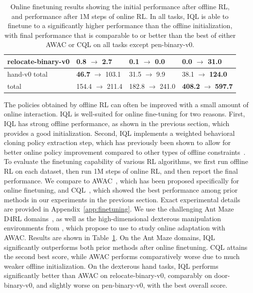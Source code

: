 \documentclass{article} %
\def\ourname{IQL\xspace}
\begin{document}
\begin{table}
\begin{tabular}{ l ||p{1.5cm} |p{1.5cm} | p{1.5cm}  }
    relocate-binary-v0 & \textbf{0.8} \; \; $\rightarrow$ 2.7 & 0.1 \; \; $\rightarrow$ 0.0 & 0.0 \; \; $\rightarrow$ \textbf{31.0} \\ \hline
    hand-v0 total & \textbf{46.7} \; $\rightarrow$ 103.1 & 31.5 \; $\rightarrow$ 9.9 & 38.1 \; $\rightarrow$ \textbf{124.0} \\ \hline \hline
    total & 154.4 $\rightarrow$ 211.4 & 182.8 $\rightarrow$ 241.0 & \textbf{408.2} $\rightarrow$ \textbf{597.7}
\end{tabular}
\caption{Online finetuning results showing the initial performance after offline RL, and performance after 1M steps of online RL. In all tasks, \ourname is able to finetune to a significantly higher performance than the offline initialization, with final performance that is comparable to or better than the best of either AWAC or CQL on all tasks except pen-binary-v0.}
\label{tab:finetuning}
\end{table}

The policies obtained by offline RL can often be improved with a small amount of online interaction.
\ourname is well-suited for online fine-tuning for two reasons.
First, \ourname has strong offline performance, as shown in the previous section, which provides a good initialization.
Second, \ourname implements a weighted behavioral cloning policy extraction step,
which has previously been shown to allow for better online policy improvement compared to other types of offline constraints~\citep{nair2020awac}.
To evaluate the finetuning capability of various RL algorithms, we first run offline RL on each dataset, then run 1M steps of online RL, and then report the final performance.
We compare to AWAC~\citep{nair2020awac}, which has been proposed specifically for online finetuning, and CQL~\citep{kumar2020conservative}, which showed the best performance among prior methods in our experiments in the previous section. Exact experimental details are provided in Appendix~\ref{app:finetuning}. We use the challenging Ant Maze D4RL domains~\citep{fu2020d4rl}, as well as the high-dimensional dexterous manipulation environments from \citet{rajeswaran2018dextrous}, which \citet{nair2020awac} propose to use to study online adaptation with AWAC. Results are shown in Table~\ref{tab:finetuning}. 
On the Ant Maze domains, \ourname significantly outperforms both prior methods after online finetuning. CQL attains the second best score, while AWAC performs comparatively worse due to much weaker offline initialization. On the dexterous hand tasks, \ourname performs significantly better than AWAC on relocate-binary-v0, comparably on door-binary-v0, and slightly worse on pen-binary-v0, with the best overall score.
\end{document}

